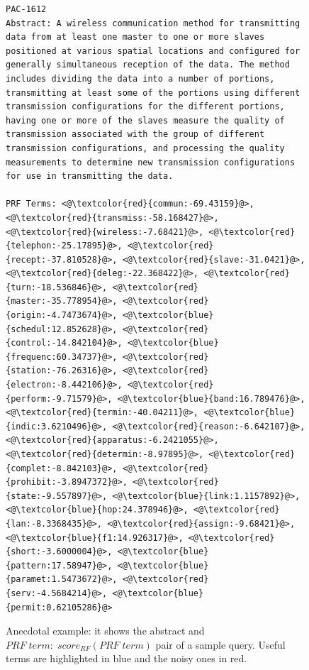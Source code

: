 \documentclass{sig-alternate}
\begin{document}
\begin{figure}[htpb]
\begin{framed}
\vspace*{-2ex}
  \centering
 \begin{lstlisting}[basicstyle=\tiny\ttfamily , linewidth=\columnwidth,breaklines=true] 
PAC-1612
Abstract: A wireless communication method for transmitting data from at least one master to one or more slaves positioned at various spatial locations and configured for generally simultaneous reception of the data. The method includes dividing the data into a number of portions, transmitting at least some of the portions using different transmission configurations for the different portions, having one or more of the slaves measure the quality of transmission associated with the group of different transmission configurations, and processing the quality measurements to determine new transmission configurations for use in transmitting the data.

PRF Terms: <@\textcolor{red}{commun:-69.43159}@>, <@\textcolor{red}{transmiss:-58.168427}@>, <@\textcolor{red}{wireless:-7.68421}@>, <@\textcolor{red}{telephon:-25.17895}@>, <@\textcolor{red}{recept:-37.810528}@>, <@\textcolor{red}{slave:-31.0421}@>, <@\textcolor{red}{deleg:-22.368422}@>, <@\textcolor{red}{turn:-18.536846}@>, <@\textcolor{red}{master:-35.778954}@>, <@\textcolor{red}{origin:-4.7473674}@>, <@\textcolor{blue}{schedul:12.852628}@>, <@\textcolor{red}{control:-14.842104}@>, <@\textcolor{blue}{frequenc:60.34737}@>, <@\textcolor{red}{station:-76.26316}@>, <@\textcolor{red}{electron:-8.442106}@>, <@\textcolor{red}{perform:-9.71579}@>, <@\textcolor{blue}{band:16.789476}@>, <@\textcolor{red}{termin:-40.04211}@>, <@\textcolor{blue}{indic:3.6210496}@>, <@\textcolor{red}{reason:-6.642107}@>, <@\textcolor{red}{apparatus:-6.2421055}@>, <@\textcolor{red}{determin:-8.97895}@>, <@\textcolor{red}{complet:-8.842103}@>, <@\textcolor{red}{prohibit:-3.8947372}@>, <@\textcolor{red}{state:-9.557897}@>, <@\textcolor{blue}{link:1.1157892}@>, <@\textcolor{blue}{hop:24.378946}@>, <@\textcolor{red}{lan:-8.3368435}@>, <@\textcolor{red}{assign:-9.68421}@>, <@\textcolor{blue}{f1:14.926317}@>, <@\textcolor{red}{short:-3.6000004}@>, <@\textcolor{blue}{pattern:17.58947}@>, <@\textcolor{blue}{paramet:1.5473672}@>, <@\textcolor{red}{serv:-4.5684214}@>, <@\textcolor{blue}{permit:0.62105286}@>
 \end{lstlisting} 
 \vspace*{-2ex}
\end{framed}
 \vspace*{-2ex}
  \caption{Anecdotal example: it shows the abstract and $ PRF \; term: \; score_{RF}(PRF \; term) $ pair of a sample query. Useful terms are highlighted in blue and the noisy ones in red.}
  \label{fig:anecdotal}  
\end{figure}
\end{document}

